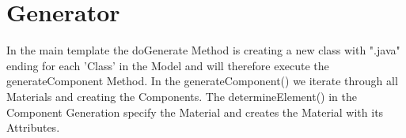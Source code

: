 \chapter{Generator}
In the main template the doGenerate Method is creating a new class with ".java" ending for each 'Class' in the Model and will therefore execute the generateComponent Method. In the generateComponent() we iterate through all Materials and creating the Components. The determineElement() in the Component Generation specify the Material and creates the Material with its Attributes.

